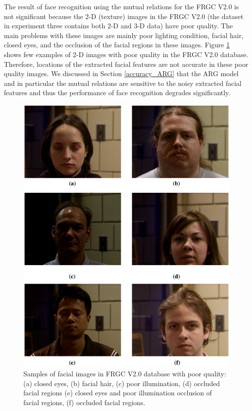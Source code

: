 {The result of face recognition using the mutual relations for the
FRGC V2.0 is not significant because the 2-D (texture) images in the
FRGC V2.0 (the dataset in experiment three contains both 2-D and 3-D
data) have poor quality. The main problems with these images are
mainly poor lighting condition, facial hair, closed eyes, and the
occlusion of the facial regions in these images. Figure
\ref{fig_poor_images_frgc} shows few examples of 2-D images with
poor quality in the FRGC V2.0 database. Therefore, locations of the
extracted facial features are not accurate in these poor quality
images. We discussed in Section \ref{accuracy_ARG} that the ARG
model and in particular the mutual relations are sensitive to the
noisy extracted facial features and thus the performance of face
recognition degrades significantly.
\begin{figure}
\begin{center}
\includegraphics[scale = 0.6]{./chapters/figures/poor_images_frgc.eps}
\caption{Samples of facial images in FRGC V2.0 database with poor
quality: (a) closed eyes, (b) facial hair, (c) poor illumination,
(d) occluded facial regions (e) closed eyes and poor illumination
occlusion of facial regions, (f) occluded facial
regions.}\label{fig_poor_images_frgc}
\end{center}
\end{figure}

}
